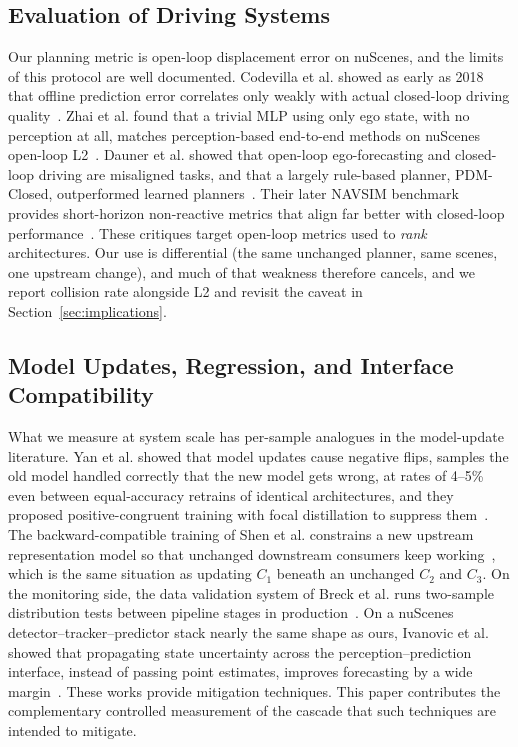 \documentclass[conference]{IEEEtran}
\begin{document}
\subsection{Evaluation of Driving Systems}
Our planning metric is open-loop displacement error on nuScenes, and the
limits of this protocol are well documented. Codevilla et al. showed as early
as 2018 that offline prediction error correlates only weakly with actual
closed-loop driving quality~\cite{codevilla2018offline}. Zhai et al. found
that a trivial MLP using only ego state, with no perception at all, matches
perception-based end-to-end methods on nuScenes open-loop
L2~\cite{zhai2023rethinking}. Dauner et al. showed that open-loop
ego-forecasting and closed-loop driving are misaligned tasks, and that a
largely rule-based planner, PDM-Closed, outperformed learned
planners~\cite{dauner2023parting}. Their later NAVSIM benchmark provides
short-horizon non-reactive metrics that align far better with closed-loop
performance~\cite{dauner2024navsim}. These critiques target open-loop metrics
used to \emph{rank} architectures. Our use is differential (the same unchanged
planner, same scenes, one upstream change), and much of that weakness therefore cancels,
and we report collision rate alongside L2 and revisit the caveat in
Section~\ref{sec:implications}.

\subsection{Model Updates, Regression, and Interface Compatibility}
What we measure at system scale has per-sample analogues in the model-update
literature. Yan et al. showed that model updates cause negative flips, samples
the old model handled correctly that the new model gets wrong, at rates of
4--5\% even between equal-accuracy retrains of identical architectures, and
they proposed positive-congruent training with focal distillation to suppress
them~\cite{yan2021pctraining}. The backward-compatible training of Shen et al.
constrains a new upstream representation model so that unchanged downstream
consumers keep working~\cite{shen2020bct}, which is the same situation as
updating $C_1$ beneath an unchanged $C_2$ and $C_3$. On the monitoring side, the data
validation system of Breck et al. runs two-sample distribution tests between
pipeline stages in production~\cite{breck2019data}. On a nuScenes
detector--tracker--predictor stack nearly the same shape as ours, Ivanovic et
al. showed that propagating state uncertainty across the
perception--prediction interface, instead of passing point estimates, improves
forecasting by a wide margin~\cite{ivanovic2022propagating}. These works
provide mitigation techniques. This paper contributes the complementary
controlled measurement of the cascade that such techniques are intended to
mitigate.
\end{document}
